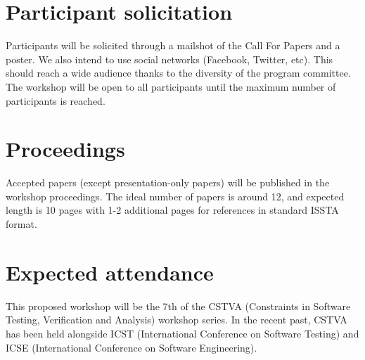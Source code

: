 \documentclass{sig-alternate}
\begin{document}
\section{Participant solicitation}
\vspace{0.2cm} Participants will be solicited through a mailshot of
the Call For Papers and a poster. We also intend to use social networks (Facebook, Twitter, etc). This should reach a wide audience
thanks to the diversity of the program committee.  The workshop will
be open to all participants until the maximum number of participants
is reached.

\section{Proceedings}
\vspace{0.2cm} Accepted papers (except presentation-only papers) will
be published in the workshop proceedings.  The ideal number of papers
is around 12, and expected length is 10 pages with 1-2 additional pages
for references in standard ISSTA format.

\section{Expected attendance}
\vspace{0.2cm} This proposed workshop will be the 7th of the CSTVA
(Constraints in Software Testing, Verification and Analysis) workshop
series. In the recent past, CSTVA has been held alongside ICST 
(International
Conference on Software Testing) and ICSE (International Conference on Software Engineering).
\end{document}
